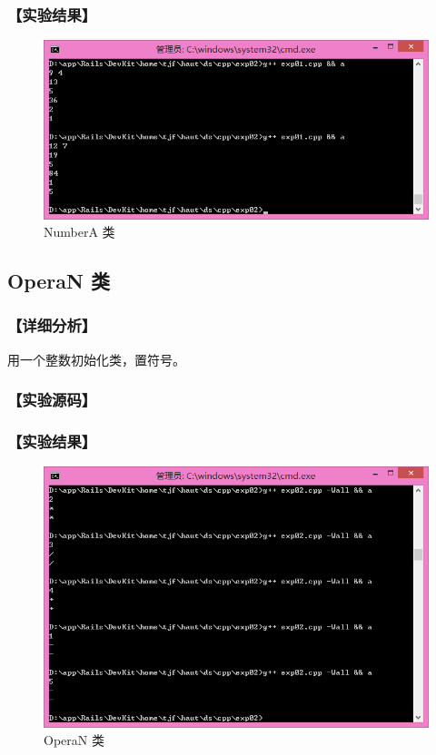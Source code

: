 \subsubsection*{【实验结果】}
\begin{figure}[htp]
\centering
\includegraphics[width=\textwidth]{exp02/exp01.png}
\caption{\label{out02_01}NumberA 类}
\end{figure}

\subsection{OperaN 类}
\subsubsection*{【详细分析】}
用一个整数初始化类，置符号。
\subsubsection*{【实验源码】}
{\linespread{1}}
\subsubsection*{【实验结果】}
\begin{figure}[htp]
\centering
\includegraphics[width=\textwidth]{exp02/exp02.png}
\caption{\label{out02_02}OperaN 类}
\end{figure}

